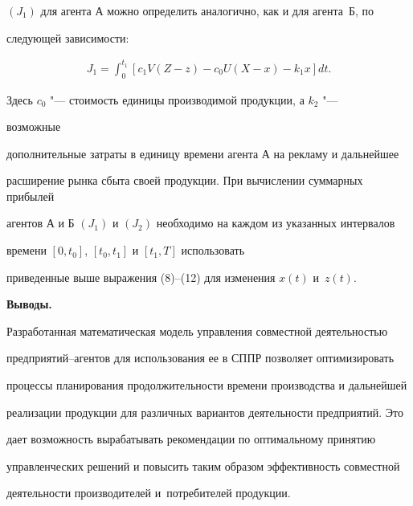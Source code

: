 $(J_1)$ для агента А можно определить аналогично, как и для агента~Б, по

следующей зависимости:

\[

   \begin{aligned}

J_1=\int^{t_1}_{0}\left[c_1V(Z-z)-c_0U(X-x)-k_1x\right]dt.

   \end{aligned}

\]



\noindent Здесь $c_0$ "---  стоимость единицы производимой продукции, а $k_2$ "---

возможные

дополнительные затраты в единицу времени агента А на рекламу и дальнейшее

расширение рынка сбыта своей продукции. При вычислении суммарных прибылей

агентов А и Б $(J_1)$ и $(J_2)$ необходимо на каждом из указанных интервалов

времени $[0, t_0]$, $[t_0, t_1]$ и $[t_1, T]$ использовать

приведенные выше выражения (8)--(12) для изменения $x(t)$ и~$z(t)$.



{\bf Выводы.}

Разработанная математическая модель управления совместной деятельностью

предприятий--агентов для использования ее в СППР позволяет оптимизировать

процессы планирования продолжительности времени производства и дальнейшей

реализации продукции для различных вариантов деятельности предприятий. Это

дает возможность вырабатывать рекомендации по оптимальному принятию

управленческих решений и повысить таким образом эффективность совместной

деятельности производителей и~потребителей продукции.



